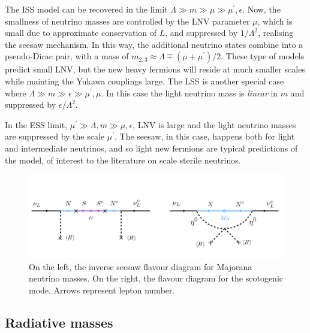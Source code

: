 The ISS model can be recovered in the limit $\Lambda \gg m \gg \mu \gg \mu^\prime, \epsilon$. Now, the smallness of neutrino masses are controlled by the LNV parameter $\mu$, which is small due to approximate conservation of $L$, and suppressed by $1/\Lambda^2$, realising the seesaw mechanism. In this way, the additional neutrino states combine into a pseudo-Dirac pair, with a mass of $m_{2,3} \approx \Lambda \mp (\mu+\mu^\prime)/2$. These type of models predict small LNV, but the new heavy fermions will reside at much smaller scales while mainting the Yukawa couplings large. The LSS is another special case where $\Lambda \gg m \gg \epsilon \gg \mu^\prime,\mu$. In this case the light neutrino mass is \emph{linear} in $m$ and suppressed by $\epsilon/\Lambda^2$. 


In the ESS limit, $\mu^\prime \gg \Lambda, m \gg \mu, \epsilon$, LNV is large and the light neutrino masses are suppressed by the scale $\mu^\prime$. The seesaw, in this case, happens both for light and intermediate neutrinos, and so light new fermions are typical predictions of the model, of interest to the literature on scale sterile neutrinos.

%
\begin{figure}[t]
\centering
\includegraphics[width=\textwidth]{LNV_diagrams.pdf}
\caption[Diagrams for inverse seesaw and scotogenic model.]{On the left, the inverse seesaw flavour diagram for Majorana neutrino masses. On the right, the flavour diagram for the scotogenic mode. Arrows represent lepton number. \label{fig:LNVdiagrams}}
\end{figure}
%
\subsection{Radiative masses}\label{sec:radiative}

